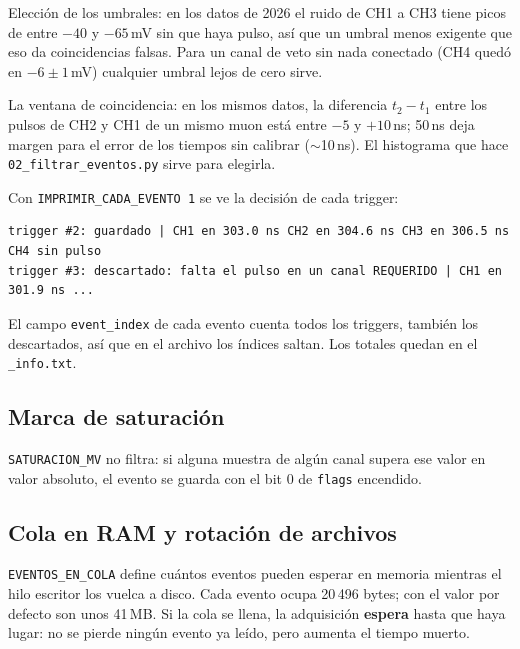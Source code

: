 \documentclass[11pt,a4paper]{article}
\newcommand{\code}[1]{\texttt{#1}}
\begin{document}
Elección de los umbrales: en los datos de 2026 el ruido de CH1 a CH3 tiene picos de
entre $-40$ y $-65$\,mV sin que haya pulso, así que un umbral menos exigente que eso
da coincidencias falsas. Para un canal de veto sin nada conectado (CH4 quedó en
$-6 \pm 1$\,mV) cualquier umbral lejos de cero sirve.

La ventana de coincidencia: en los mismos datos, la diferencia $t_2 - t_1$ entre los
pulsos de CH2 y CH1 de un mismo muon está entre $-5$ y $+10$\,ns; 50\,ns deja margen
para el error de los tiempos sin calibrar ($\sim$10\,ns). El histograma que hace
\code{02\_filtrar\_eventos.py} sirve para elegirla.

Con \code{IMPRIMIR\_CADA\_EVENTO 1} se ve la decisión de cada trigger:

\begin{lstlisting}[style=shell]
trigger #2: guardado | CH1 en 303.0 ns CH2 en 304.6 ns CH3 en 306.5 ns CH4 sin pulso
trigger #3: descartado: falta el pulso en un canal REQUERIDO | CH1 en 301.9 ns ...
\end{lstlisting}

El campo \code{event\_index} de cada evento cuenta todos los triggers, también los
descartados, así que en el archivo los índices saltan. Los totales quedan en el
\code{\_info.txt}.

\subsection{Marca de saturación}

\code{SATURACION\_MV} no filtra: si alguna muestra de algún canal supera ese valor
en valor absoluto, el evento se guarda con el bit 0 de \code{flags} encendido.

\subsection{Cola en RAM y rotación de archivos}

\code{EVENTOS\_EN\_COLA} define cuántos eventos pueden esperar en memoria mientras el
hilo escritor los vuelca a disco. Cada evento ocupa 20\,496 bytes; con el valor por
defecto son unos 41\,MB. Si la cola se llena, la adquisición \textbf{espera} hasta
que haya lugar: no se pierde ningún evento ya leído, pero aumenta el tiempo muerto.
\end{document}
